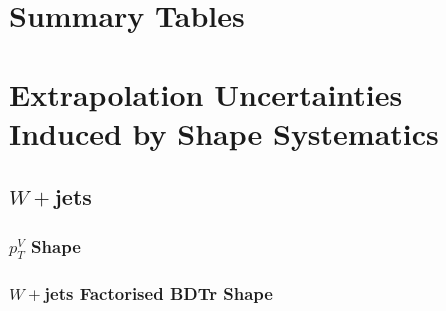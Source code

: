 \section{Summary Tables}



\section{Extrapolation Uncertainties Induced by Shape Systematics}
\subsection{$W+$jets}
\subsubsection{$p_T^V$ Shape}

\subsubsection{$W+$jets Factorised BDTr Shape}

